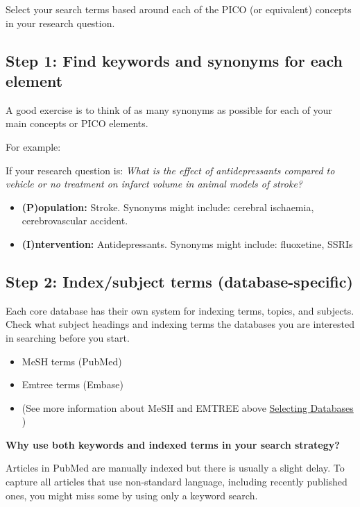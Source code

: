 \documentclass[
]{book}
\providecommand{\tightlist}{%
  \setlength{\itemsep}{0pt}\setlength{\parskip}{0pt}}
\begin{document}
Select your search terms based around each of the PICO (or equivalent) concepts in your research question.

\hypertarget{step-1-find-keywords-and-synonyms-for-each-element}{%
\subsection{Step 1: Find keywords and synonyms for each element}\label{step-1-find-keywords-and-synonyms-for-each-element}}

A good exercise is to think of as many synonyms as possible for each of your main concepts or PICO elements.

For example:

If your research question is: \emph{What is the effect of antidepressants compared to vehicle or no treatment on infarct volume in animal models of stroke?}

\begin{itemize}
\tightlist
\item
  \textbf{(P)opulation:} Stroke. Synonyms might include: cerebral ischaemia, cerebrovascular accident.
\item
  \textbf{(I)ntervention:} Antidepressants. Synonyms might include: fluoxetine, SSRIs
\end{itemize}

\hypertarget{step-2-indexsubject-terms-database-specific}{%
\subsection{Step 2: Index/subject terms (database-specific)}\label{step-2-indexsubject-terms-database-specific}}

Each core database has their own system for indexing terms, topics, and subjects. Check what subject headings and indexing terms the databases you are interested in searching before you start.

\begin{itemize}
\tightlist
\item
  MeSH terms (PubMed)
\item
  Emtree terms (Embase)
\item
  (See more information about MeSH and EMTREE above \protect\hyperlink{Selecting-Databases}{Selecting Databases} )
\end{itemize}

\textbf{Why use both keywords and indexed terms in your search strategy?}

Articles in PubMed are manually indexed but there is usually a slight delay. To capture all articles that use non-standard language, including recently published ones, you might miss some by using only a keyword search.
\end{document}
